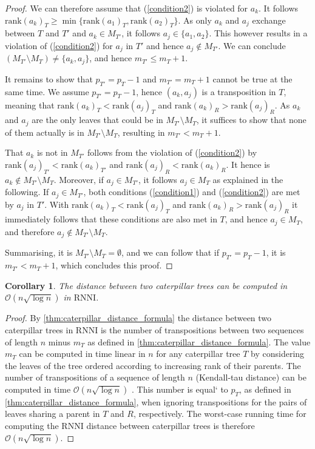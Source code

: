 \documentclass[11pt]{amsart}
\newtheorem{corollary}{Corollary}
\newcommand{\rnni}{\mathrm{RNNI}}
\newcommand{\rank}{\mathrm{rank}}
\renewcommand{\O}{\mathcal O}
\begin{document}
\begin{proof}
	We can therefore assume that (\ref{condition2}) is violated for $a_k$.
	It follows $\rank(a_k)_T \geq \min\{\rank(a_1)_T, \rank(a_2)_T\}$.
	As only $a_k$ and $a_j$ exchange between $T$ and $T'$ and $a_k \in M_{T'}$, it follows $a_j \in \{a_1, a_2\}$.
	This however results in a violation of (\ref{condition2}) for $a_j$ in $T'$ and hence $a_j \notin M_{T'}$.
	We can conclude $(M_{T'} \setminus M_T) \neq \{a_k, a_j\}$, and hence $m_{T'} \leq m_T + 1$.

	It remains to show that $p_{T'} = p_T - 1$ and $m_{T'} = m_T + 1$ cannot be true at the same time.
	We assume $p_{T'} = p_T - 1$, hence $(a_k,a_j)$ is a transposition in $T$, meaning that $\rank(a_k)_T < \rank(a_j)_T$ and $\rank(a_k)_R > \rank(a_j)_R$.
	As $a_k$ and $a_j$ are the only leaves that could be in $M_{T'} \setminus M_T$, it suffices to show that none of them actually is in $M_{T'} \setminus M_T$, resulting in $m_{T'} < m_T + 1$.

	That $a_k$ is not in $M_{T'}$ follows from the violation of (\ref{condition2}) by $\rank(a_j)_{T'} < \rank(a_k)_{T'}$ and $\rank(a_j)_R < \rank(a_k)_R$.
	It hence is $a_k \notin M_{T'} \setminus M_T$.
	Moreover, if $a_j \in M_{T'}$, it follows $a_j \in M_T$ as explained in the following.
	If $a_j \in M_{T'}$, both conditions (\ref{condition1}) and (\ref{condition2}) are met by $a_j$ in $T'$.
	With $\rank(a_k)_T < \rank(a_j)_T$ and $\rank(a_k)_R > \rank(a_j)_R$ it immediately follows that these conditions are also met in $T$, and hence $a_j \in M_T$, and therefore $a_j \notin M_{T'} \setminus M_T$.

	Summarising, it is $M_{T'} \setminus M_T = \emptyset$, and we can follow that if $p_{T'} = p_T - 1$, it is $m_{T'} < m_T + 1$, which concludes this proof.
\end{proof}

\begin{corollary}
	The distance between two caterpillar trees can be computed in $\O(n \sqrt{\log n})$ in $\rnni$.
	\label{cor:caterpillar_distance_rnni_nlogn}
\end{corollary}

\begin{proof}
	By \autoref{thm:caterpillar_distance_formula} the distance between two caterpillar trees in $\rnni$ is the number of transpositions between two sequences of length $n$ minus $m_T$ as defined in \autoref{thm:caterpillar_distance_formula}.
	The value $m_T$ can be computed in time linear in $n$ for any caterpillar tree $T$ by considering the leaves of the tree ordered according to increasing rank of their parents.
	The number of transpositions of a sequence of length $n$ (Kendall-tau distance) can be computed in time $\O(n \sqrt{\log n})$ \autocite{Chan2010-ls}.
	This number is equal` to $p_T$, as defined in \autoref{thm:caterpillar_distance_formula}, when ignoring transpositions for the pairs of leaves sharing a parent in $T$ and $R$, respectively.
	The worst-case running time for computing the $\rnni$ distance between caterpillar trees is therefore $\O(n \sqrt{\log n})$.
\end{proof}
\end{document}
